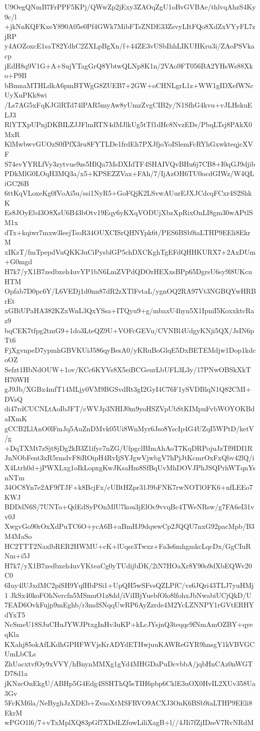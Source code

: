 U9OegQNmB7FrPPF5KPj/QWwZp2jExy3ZAOqZgU1oBvGVBAe/thlvqAhzS4Ky9c/l
+jkNnKQFKxeY890A05e0Pf4GWk7MibFTsZNDE33ZsvyLItFQo8XdZxVYyFL7zjRP
y4AOZoxcE1saT82YdhC2ZXLpBgXn/f+44ZE3vUSbIhhLIKUHKru3i/ZAoPSVkacp
jEdH8q9V1G+A+SujYTagGrQ8YbtwQLNp8K1n/2VAo9FT056BA2YHsWs88Xko+P9B
bBmnaMTHLdkA6pmBTWgG8ZUEB7+2GW+oCHNLgrL1z+WW1gIDXefWNcUyXuPKk8wi
/Ls7AG5xFqKJGlRTd74lPAR5myAw8yUmzZvgCIB2y/N1SfhG4kvu+vJLHskuELJ3
RlYTXpUPnjDKBILZJJFlmRTN4dMJlkUg5tTf1dHc8NvzEDs/PbqLTsj8PAkX0MxR
KlMwbwvGUOzS0fPfX3ru8FYTLDe1frdEh7PXJfjoYoISlemFcRYhGxwkteqjcXVF
S74evYYRLfVy3zytvue9zs5HlQa7MsDXIdTF4SHAIVQvBHu6j7CB8+I0qGJ9djib
PDkMlG0LOqH3MQ3a/x5+KPSEZZVax+FAh/7/IjAzOH6TU0ocdGIWz/W4QLiGC26B
6ttKqVLoxeKg0fVoAi5u/ssi1NyR5+GoFQjK2LSvwAUurEJXJCdcqFCxr4S2ShkK
Es8JOyEb43O8XsU6B43bOtv19Eqy6yKXqVODUjXbzXpRixOnLI8gm30wAPtlSM1x
dTx+kqiwr7mxw3leejTsoR34OUXCISrQHNYpk6t/PES6BSb9iaLTHP9EEli8EkrM
xIKzT/fmTpepdVuQKK3uCiPysblGP5chDXCKghTgEFdQHHKURX7+2AxDUm+G0mgd
H7k7/yX1B7zedbxeh4uvYP1bN6LmZVPdQDOrHEXxsBPp65DgrsU6sy9l8UKcuHTM
Opfab7D0pc6Y/L6VEDj1d0nn87dR2zXTlFvtaL/ygnOQ2RA97Vt3NGBQYwHRBrEt
xGBiUPaHA382KZxWnL3QxYSsa+ITQyu9+g/mbaxU4hyn5X1IpniI5KoxxktcRaz9
bqCEK7tfpg2tmG9+1do3LteQZ9U+VOFcGEVu/CVNBl4UdgyKNji5QX/JsIN6pTt6
FjXgvnpeD7ypmhGBVKUiJ586qyBesA0/yKRuBoGlqE5DxBETEMdjw1Dop1kdcoOZ
Sefzt1HbNdOUW+1ov/KCc6KYVs8X5eiBCGeurLbUFL3L3y/17PNwOBSkXkTH70WH
gJ9Jb/XGBx4mfT14MLjy0VM9BGSvdRt3gI2GyI4C76F1ySVDBlqN1Q82CMI+DVsQ
di47rdCUCNLtAoIbJFT/cWVJp3NHIJ0m9yoHSZVpUbStKIMpuFvbWOYOKBdaIXmK
gCCB2LlAnO0lFmJq5AuZnDMvk05Ui8WnMyr6Jso8YscIp4G4UZqI5WPtD/ketV/g
+DqTXMt7zSjt8jDg2kB3Z1ifyc7nZG/UfpgclBImAhAoT7KqDRPojuJzTf9IDI1R
JnNObFent3xR5rmdvF8iROipH4RvIjSYJgwVjwbgV7hPjJtKcmrOxFxQbv42lQ/i
X4Ltrh0d+jPWXLxg1oIkLopxgKwJKsaHm8SfBqUvMhDOVJPhJSQPrhWTqnYsnNTm
34OC8Yn7e2AF9fTJF+k8BcjFx/cUBtHZpr31J9bFNK7rwNOTlOFK6+nfLEEo7KWJ
BDDdN6S/7UNTo+QdEdSyPOnMlU7kou3jElOc9vvqBc4TWeNRsw/g7FA6eI31vv0J
XwgvGo90rOxXdPuTC6O+ycA6B+aBmHJ9dqwwCp2JQQU7nxG92pacMpb/B3M4MaSo
HC2TTT2NaxlbRER2HWMU+cK+lUqsr3Twxz+Fa3s6mhgmkcLqcDx/GgCIuRNm+i5J
H7k7/yX1B7zedbxeh4uvYKteaCg0yTUdijbDK/2iN7HOaXr8Y90o9dXbEQWv20C0
6Iuy4lUJxdMC2piSH9YqfHbPSi1+UpQH5wSFvsQZLPfC/vs6JQri43TLJ7yuHMj1
JkSx40koFOhNercfn5MSmuO1z8dd/iViIBjYuebfOlo8lfohxJbNwabiUCjQkD/U
7EAD6OvkFujp9mEghb/r3mdSNqqUwRP6AyZzrde4M2YcLZNNPY1rGVtERHYdYxT5
NcSmeU18SJuCHuJYWJPtxgInHv3uKP+kLcJYsjnQ3teqqc9fNmAmOZBY+qyeqKla
KXahj85okAfLKdhGPHFWVjsKrADYdETHwjuuKAWReGYR9hnsgY1kVBVGCUmLbCLs
ZhUacxtvfOy9xVVY/hBnynMMXg1gYd4MHGDaPuDcvbbA/jqbHnCAz0nWGTD78d1a
jKNzcOnEkgU/ABHp5G4Edg4SSHThQ5sTIH6pbp6CklE3uOX0HvIL2XUv358Ua3Gv
5FcKM6la/NeByghJzXDEb+ZvaoXtMSFRVO9ACXJ3OnK6BSb9iaLTHP9EEli8EkrM
wPGO1l6/7+vTxMplXQ83pGf7XDdLZfuwLiliXagB+l//4JIi7fZjIDseV7RvNRdM
